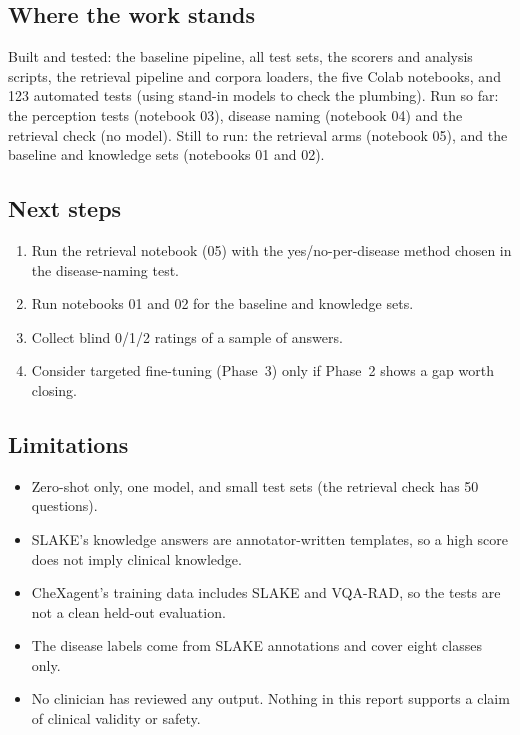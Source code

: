 \documentclass[11pt,a4paper]{article}
\begin{document}
\subsection{Where the work stands}
Built and tested: the baseline pipeline, all test sets, the scorers and analysis scripts, the retrieval pipeline and corpora
loaders, the five Colab notebooks, and 123 automated tests (using stand-in models to check the plumbing).
Run so far: the perception tests (notebook 03), disease naming (notebook 04) and the retrieval check (no model). Still to run: the
retrieval arms (notebook 05), and the baseline and knowledge sets (notebooks 01 and 02).

\subsection{Next steps}
\begin{enumerate}
\item Run the retrieval notebook (05) with the yes/no-per-disease method chosen in the disease-naming test.
\item Run notebooks 01 and 02 for the baseline and knowledge sets.
\item Collect blind 0/1/2 ratings of a sample of answers.
\item Consider targeted fine-tuning (Phase~3) only if Phase~2 shows a gap worth closing.
\end{enumerate}

\subsection{Limitations}
\begin{itemize}
\item Zero-shot only, one model, and small test sets (the retrieval check has 50 questions).
\item SLAKE's knowledge answers are annotator-written templates, so a high score does not imply clinical knowledge.
\item CheXagent's training data includes SLAKE and VQA-RAD, so the tests are not a clean held-out evaluation.
\item The disease labels come from SLAKE annotations and cover eight classes only.
\item No clinician has reviewed any output. Nothing in this report supports a claim of clinical validity or safety.
\end{itemize}

\end{document}
